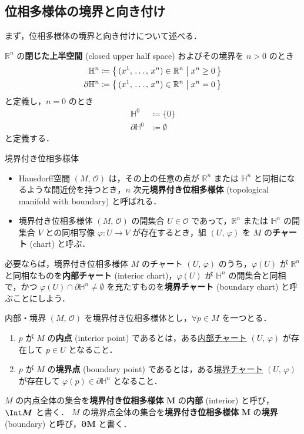 \documentclass[algtopo_main]{subfiles}
\begin{document}
\subsection{位相多様体の境界と向き付け}

まず，位相多様体の境界と向き付けについて述べる．

$\mathbb{R}^n$ の\textbf{閉じた上半空間} (closed upper half space) およびその境界を $n > 0$ のとき
\begin{align}
	\mathbb{H}^n &\coloneqq \bigl\{\, (x^1,\, \dots ,\, x^n) \in \mathbb{R}^n \bigm| x^n \ge 0 \,\bigr\} \\
	\partial \mathbb{H}^n &\coloneqq \bigl\{\, (x^1,\, \dots ,\, x^n) \in \mathbb{R}^n \bigm| x^n = 0 \,\bigr\} 
\end{align}
と定義し，$n=0$ のとき
\begin{align}
	\mathbb{H}^0 &\coloneqq \{ 0 \} \\
	\partial \mathbb{H}^0 &\coloneqq \emptyset
\end{align}
と定義する．
\begin{mydef}[label=def:mani-with-boundary]{境界付き位相多様体}
	\begin{itemize}
        \item Hausdorff空間 $(M,\, \mathscr{O})$ は，その上の任意の点が $\mathbb{R}^n$ または $\mathbb{H}^n$ と同相になるような開近傍を持つとき，$n$ 次元\textbf{境界付き位相多様体} (topological manifold with boundary) と呼ばれる．
        \item 境界付き位相多様体 $(M,\, \mathscr{O})$ の開集合 $U \in \mathscr{O}$ であって，$\mathbb{R}^n$ または $\mathbb{H}^n$ の開集合 $V$ との同相写像 $\varphi \colon U \to V$ が存在するとき，組 $(U,\, \varphi)$ を $M$ の\textbf{チャート} (chart) と呼ぶ． 
    \end{itemize}
\end{mydef}

必要ならば，境界付き位相多様体 $M$ のチャート $(U,\, \varphi)$ のうち，$\varphi(U)$ が $\mathbb{R}^n$ と同相なものを\textbf{内部チャート} (interior chart)，$\varphi(U)$ が $\mathbb{H}^n$ の開集合と同相で，かつ $\varphi(U) \cap \partial \mathbb{H}^n \neq \emptyset$ を充たすものを\textbf{境界チャート} (boundary chart) と呼ぶことにしよう．

\begin{mydef}[label=def:int-manifold-with-boundary]{内部・境界}
	$(M,\, \mathscr{O})$ を境界付き位相多様体とし，$\forall p \in M$ を一つとる．
	\begin{enumerate}
		\item $p$ が $M$ の\textbf{内点} (interior point) であるとは，ある\underline{内部チャート} $(U,\, \varphi)$ が存在して $p \in U$ となること．
		\item $p$ が $M$ の\textbf{境界点} (boundary point) であるとは，ある\underline{境界チャート} $(U,\, \varphi)$ が存在して $\varphi(p) \in \partial \mathbb{H}^n$ となること．
	\end{enumerate}
	$M$ の内点全体の集合を\textbf{境界付き位相多様体} $\bm{M}$ の\textbf{内部} (interior) と呼び，$\bm{\Int M}$ と書く．
	$M$ の境界点全体の集合を\textbf{境界付き位相多様体} $\bm{M}$ の\textbf{境界} (boundary) と呼び，$\bm{\partial M}$ と書く．
\end{mydef}
\end{document}
